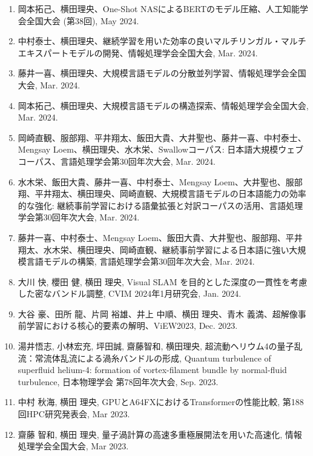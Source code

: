 \documentclass[margin,line]{cv}
\begin{document}
\begin{resume}
\begin{enumerate}
\item 岡本拓己、横田理央、One-Shot NASによるBERTのモデル圧縮、人工知能学会全国大会 (第38回), May 2024.

\item 中村泰士、横田理央、継続学習を用いた効率の良いマルチリンガル・マルチエキスパートモデルの開発、情報処理学会全国大会, Mar. 2024.

\item 藤井一喜、横田理央、大規模言語モデルの分散並列学習、情報処理学会全国大会, Mar. 2024.

\item 岡本拓己、横田理央、大規模言語モデルの構造探索、情報処理学会全国大会, Mar. 2024.

\item 岡崎直観、服部翔、平井翔太、飯田大貴、大井聖也、藤井一喜、中村泰士、Mengsay Loem、横田理央、水木栄、Swallowコーパス: 日本語大規模ウェブコーパス、言語処理学会第30回年次大会, Mar. 2024.

\item 水木栄、飯田大貴、藤井一喜、中村泰士、Mengsay Loem、大井聖也、服部翔、平井翔太、横田理央、岡崎直観、大規模言語モデルの日本語能力の効率的な強化: 継続事前学習における語彙拡張と対訳コーパスの活用、言語処理学会第30回年次大会, Mar. 2024.

\item 藤井一喜、中村泰士、Mengsay Loem、飯田大貴、大井聖也、服部翔、平井翔太、水木栄、横田理央、岡崎直観、継続事前学習による日本語に強い大規模言語モデルの構築, 言語処理学会第30回年次大会, Mar. 2024.

\item 大川 快, 櫻田 健, 横田 理央, Visual SLAM を目的とした深度の一貫性を考慮した密なバンドル調整, CVIM 2024年1月研究会, Jan. 2024.

\item 大谷 豪、田所 龍、片岡 裕雄、井上 中順、横田 理央、青木 義満、超解像事前学習における核心的要素の解明、ViEW2023, Dec. 2023.

\item 湯井悟志, 小林宏充, 坪田誠, 齋藤智和, 横田理央, 超流動ヘリウム4の量子乱流：常流体乱流による渦糸バンドルの形成, Quantum turbulence of superfluid helium-4: formation of vortex-filament bundle by normal-fluid turbulence, 日本物理学会 第78回年次大会, Sep. 2023.

\item 中村 秋海, 横田 理央, GPUとA64FXにおけるTransformerの性能比較, 第188回HPC研究発表会, Mar 2023.

\item 齋藤 智和, 横田 理央, 量子渦計算の高速多重極展開法を用いた高速化, 情報処理学会全国大会, Mar 2023.


\end{enumerate}
\end{resume}
\end{document}
